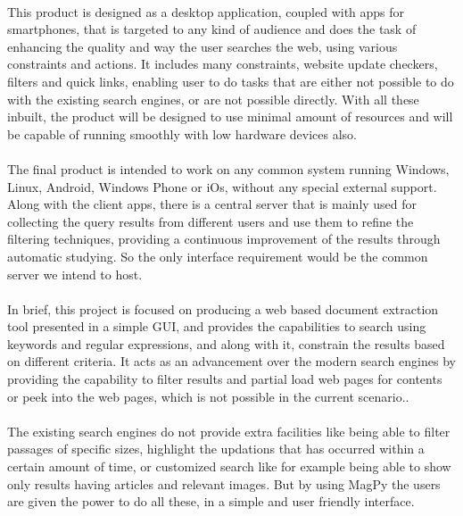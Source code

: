 \documentclass[a4paper]{report}
\begin{document}
\paragraph{}
\large\textnormal{This product is designed as a desktop application, coupled with apps for smartphones, that is targeted to any kind of audience and does the task of enhancing the quality and way the user searches the web, using various constraints and actions. It includes many constraints, website update checkers, filters and quick links, enabling user to do tasks that are either not possible to do with the existing search engines, or are not possible directly. With all these inbuilt, the product will be designed to use minimal amount of resources and will be capable of running smoothly with low hardware devices also.}

\paragraph{}
\large\textnormal{The final product is intended to work on any common system running Windows, Linux, Android, Windows Phone or iOs, without any special external support. Along with the client apps, there is a central server that is mainly used for collecting the query results from different users and use them to refine the filtering techniques, providing a continuous improvement of the results through automatic studying. So the only interface requirement would be the common server we intend to host.}

\paragraph{}
\large\textnormal{In brief, this project is focused on producing a web based document extraction tool presented in a simple GUI, and provides the capabilities to search using keywords and regular expressions, and along with it, constrain the results based on different criteria. It acts as an advancement over the modern search engines by providing the capability to filter results and partial load web pages for contents or peek into the web pages, which is not possible in the current scenario..}

\paragraph{}
\large\textnormal{The existing search engines do not provide extra facilities like being able to filter passages of specific sizes, highlight the updations that has occurred within a certain amount of time, or customized search like for example being able to show only results having articles and relevant images. But by using MagPy the users are given the power to do all these, in a simple and user friendly interface.}
\end{document}
